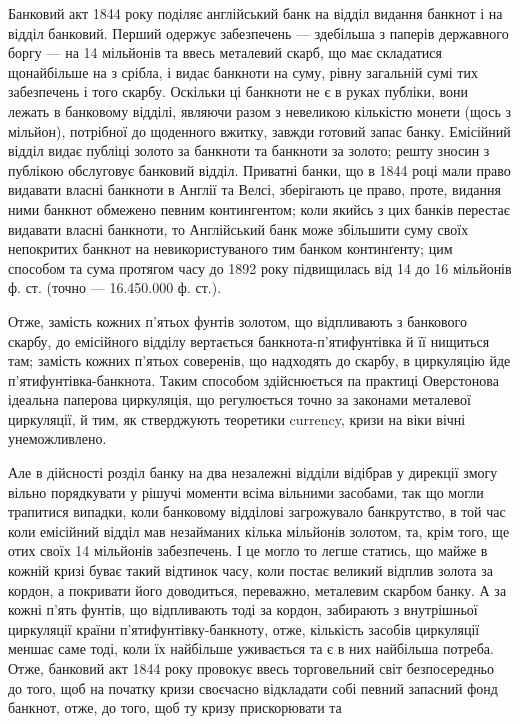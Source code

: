 Банковий акт 1844 року поділяє англійський банк на відділ видання банкнот
і на відділ банковий. Перший одержує забезпечень — здебільша з паперів державного
боргу — на 14 мільйонів та ввесь металевий скарб, що має складатися
щонайбільше на  з срібла, і видає банкноти на суму, рівну загальній сумі
тих забезпечень і того скарбу. Оскільки ці банкноти не є в руках публіки, вони
лежать в банковому відділі, являючи разом з невеликою кількістю монети (щось
з мільйон), потрібної до щоденного вжитку, завжди готовий запас банку. Емісійний
відділ видає публіці золото за банкноти та банкноти за золото; решту
зносин з публікою обслуговує банковий відділ. Приватні банки, що в 1844 році
мали право видавати власні банкноти в Англії та Велсі, зберігають це право,
проте, видання ними банкнот обмежено певним контингентом; коли якийсь з цих
банків перестає видавати власні банкноти, то Англійський банк може збільшити
суму своїх непокритих банкнот на  невикористуваного тим банком континґенту;
цим способом та сума протягом часу до 1892 року підвищилась від 14 до 16
мільйонів ф. ст. (точно — 16.450.000 ф. ст.).

Отже, замість кожних п’ятьох фунтів золотом, що відпливають з банкового
скарбу, до емісійного відділу вертається банкнота-п’ятифунтівка й її
нищиться там; замість кожних п’ятьох соверенів, що надходять до скарбу, в
циркуляцію йде п’ятифунтівка-банкнота. Таким способом здійснюється па практиці
Оверстонова ідеальна паперова циркуляція, що регулюється точно за законами
металевої циркуляції, й тим, як стверджують теоретики currency, кризи на віки
вічні унеможливлено.

Але в дійсності розділ банку на два незалежні відділи відібрав у дирекції
змогу вільно порядкувати у рішучі моменти всіма вільними засобами, так що
могли трапитися випадки, коли банковому відділові загрожувало банкрутство, в
той час коли емісійний відділ мав незайманих кілька мільйонів золотом, та, крім
того, ще отих своїх 14 мільйонів забезпечень. І це могло то легше статись, що
майже в кожній кризі буває такий відтинок часу, коли постає великий відплив
золота за кордон, а покривати його доводиться, переважно, металевим скарбом
банку. А за кожні п’ять фунтів, що відпливають тоді за кордон, забирають з
внутрішньої циркуляції країни п’ятифунтівку-банкноту, отже, кількість засобів
циркуляції меншає саме тоді, коли їх найбільше уживається та є в них найбільша
потреба. Отже, банковий акт 1844 року провокує ввесь торговельний
світ безпосередньо до того, щоб на початку кризи своєчасно відкладати собі певний
запасний фонд банкнот, отже, до того, щоб ту кризу прискорювати та
\parbreak{}  %
